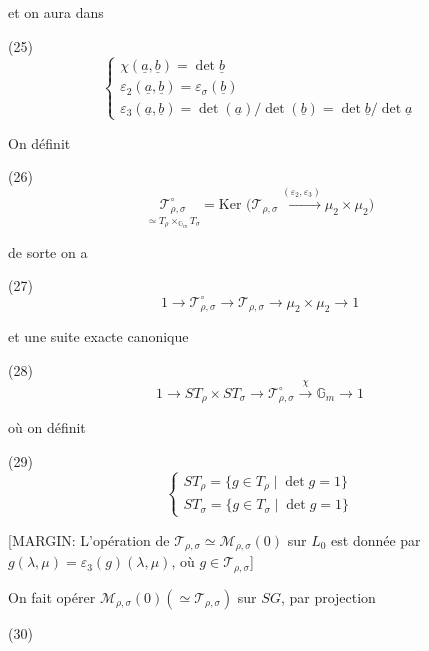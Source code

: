 \begin{enumerate}
et on aura dans

(25) $$ \begin{cases} \chi(\underline{a}, \underline{b}) = \det \underline{b} \\ \varepsilon_2(\underline{a}, \underline{b}) = \varepsilon_{\sigma}(\underline{b}) \\ \varepsilon_3(\underline{a}, \underline{b}) = \det(\underline{a}) / \det(\underline{b}) = \det \underline{b} / \det \underline{a} \end{cases} $$

On définit

(26) $$ \underset{\simeq T_{\rho} \times_{\mathbb{G}_m} T_{\sigma}}{\mathcal{T}_{\rho, \sigma}^{\circ}} = \text{Ker } \Big( \mathcal{T}_{\rho, \sigma} \xrightarrow{(\varepsilon_2, \varepsilon_3)} \mu_2 \times \mu_2 \Big) $$

de sorte on a

(27) $$ 1 \to \mathcal{T}_{\rho, \sigma}^{\circ} \to \mathcal{T}_{\rho, \sigma} \to \mu_2 \times \mu_2 \to 1 $$

et une suite exacte canonique

(28) $$ 1 \to S T_{\rho} \times S T_{\sigma} \to \mathcal{T}_{\rho, \sigma}^{\circ} \xrightarrow{\chi} \mathbb{G}_m \to 1 $$

où on définit

(29) $$ \begin{cases} S T_{\rho} = \{ g \in T_{\rho} \mid \det g = 1 \} \\ S T_{\sigma} = \{ g \in T_{\sigma} \mid \det g = 1 \} \end{cases} $$

[MARGIN: L'opération de $\mathcal{T}_{\rho, \sigma} \simeq \mathcal{M}_{\rho, \sigma}(0)$ sur $L_0$ est donnée par $g(\lambda, \mu) = \varepsilon_3(g)(\lambda, \mu)$, où $g \in \mathcal{T}_{\rho, \sigma}$]

On fait opérer $\mathcal{M}_{\rho, \sigma}(0) (\simeq \mathcal{T}_{\rho, \sigma})$ sur $SG$, par projection

(30)

\newpage


\end{enumerate}
